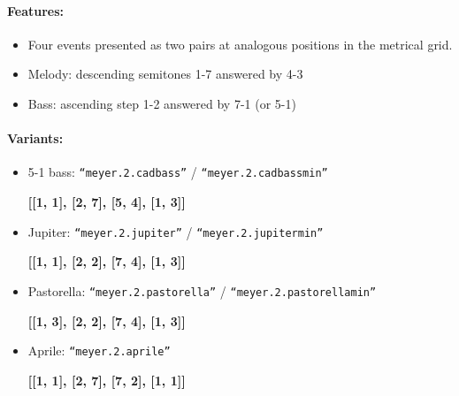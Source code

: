 ﻿\documentclass[11pt, openany]{article}
\begin{document}
\begin{itemize}
\paragraph{Features:}
\begin{itemize}
\item Four events presented as two pairs at analogous positions in the metrical grid.
\item Melody: descending semitones 1-7 answered by 4-3
\item Bass: ascending step 1-2 answered by 7-1 (or 5-1)
\end{itemize}

\paragraph{Variants:}
\begin{itemize}
\item 5-1 bass: \texttt{“meyer.2.cadbass”} / \texttt{“meyer.2.cadbassmin”}
	\begin{center}
	\textbf{[[1, 1], [2, 7], [5, 4], [1, 3]]}
	\end{center}
\item Jupiter: \texttt{“meyer.2.jupiter”} / \texttt{“meyer.2.jupitermin”}
	\begin{center}
	\textbf{[[1, 1], [2, 2], [7, 4], [1, 3]]}
	\end{center}
\item Pastorella: \texttt{“meyer.2.pastorella”} / \texttt{“meyer.2.pastorellamin”}
	\begin{center}
	\textbf{[[1, 3], [2, 2], [7, 4], [1, 3]]}
	\end{center}
\item Aprile: \texttt{“meyer.2.aprile”}
	\begin{center}
	\textbf{[[1, 1], [2, 7], [7, 2], [1, 1]]}
	\end{center}
\end{itemize}


\end{itemize}
\end{document}

